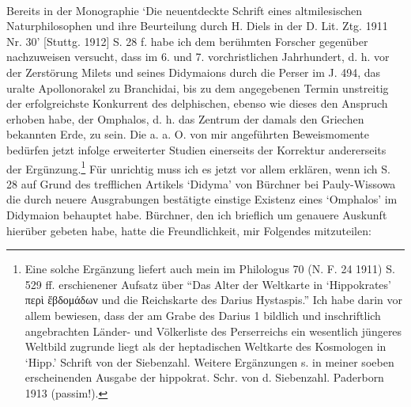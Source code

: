 \documentclass[a4paper, 11pt, oneside]{article}
\begin{document}
\paragraph{}
Bereits in der Monographie `Die neuentdeckte Schrift eines altmilesischen Naturphilosophen und ihre Beurteilung durch H. Diels in der D. Lit. Ztg. 1911 Nr. 30' [Stuttg. 1912] S. 28 f. habe ich dem berühmten Forscher gegenüber nachzuweisen versucht, dass im 6. und 7. vorchristlichen Jahrhundert, d. h. vor der Zerstörung Milets und seines Didymaions durch die Perser im J. 494, das uralte Apollonorakel zu Branchidai, bis zu dem angegebenen Termin unstreitig der erfolgreichste Konkurrent des delphischen, ebenso wie dieses den Anspruch erhoben habe, der Omphalos, d. h. das Zentrum der damals den Griechen bekannten Erde, zu sein. Die a. a. O. von mir angeführten Beweismomente bedürfen jetzt infolge erweiterter Studien einerseits der Korrektur andererseits der Ergünzung.\footnote{Eine solche Ergänzung liefert auch mein im Philologus 70 (N. F. 24 1911) S. 529 ff. erschienener Aufsatz über "`Das Alter der Weltkarte in `Hippokrates' περὶ ἕβδομάδων und die Reichskarte des Darius Hystaspis."' Ich habe darin vor allem bewiesen, dass der am Grabe des Darius 1 bildlich und inschriftlich angebrachten Länder- und Völkerliste des Perserreichs ein wesentlich jüngeres Weltbild zugrunde liegt als der heptadischen Weltkarte des Kosmologen in `Hipp.' Schrift von der Siebenzahl. Weitere Ergänzungen s. in meiner soeben erscheinenden Ausgabe der hippokrat. Schr. von d. Siebenzahl. Paderborn 1913 (passim!).} Für unrichtig muss ich es jetzt vor allem erklären, wenn ich S. 28 auf Grund des trefflichen Artikels `Didyma' von Bürchner bei Pauly-Wissowa die durch neuere Ausgrabungen bestätigte einstige Existenz eines `Omphalos' im Didymaion behauptet habe. Bürchner, den ich brieflich um genauere Auskunft hierüber gebeten habe, hatte die Freundlichkeit, mir Folgendes mitzuteilen:
\end{document}
